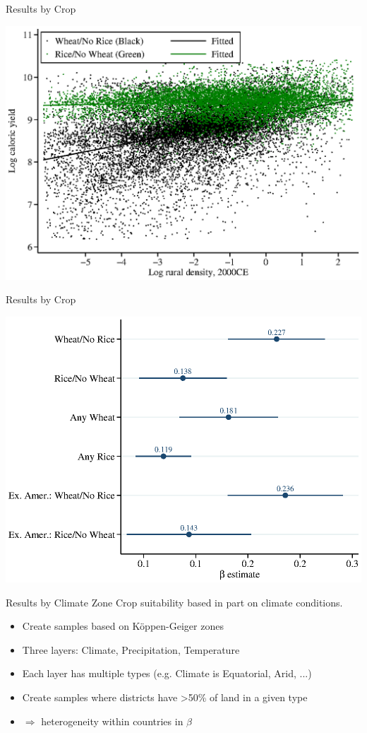 \documentclass[10pt, xcolor=dvipsnames]{beamer}
\begin{document}
\begin{frame}{Results by Crop}
\begin{center}
\includegraphics[width=.8\textwidth]{fig_beta_crop.eps}
\end{center}
\end{frame}

\begin{frame}{Results by Crop}\label{crop}
\begin{center}
\includegraphics[width=.8\textwidth]{fig_coef_crop.eps}
\end{center}
\hfill \hyperlink{cropreg}{}
\end{frame}

\begin{frame}{Results by Climate Zone}
Crop suitability based in part on climate conditions. 
\begin{itemize}
  \item Create samples based on K{\"o}ppen-Geiger zones
  \item Three layers: Climate, Precipitation, Temperature
  \item Each layer has multiple types (e.g. Climate is Equatorial, Arid, ...)
  \item Create samples where districts have >50\% of land in a given type
  \item $\Rightarrow$ heterogeneity within countries in $\beta$  
\end{itemize}
\end{frame}
\end{document}
